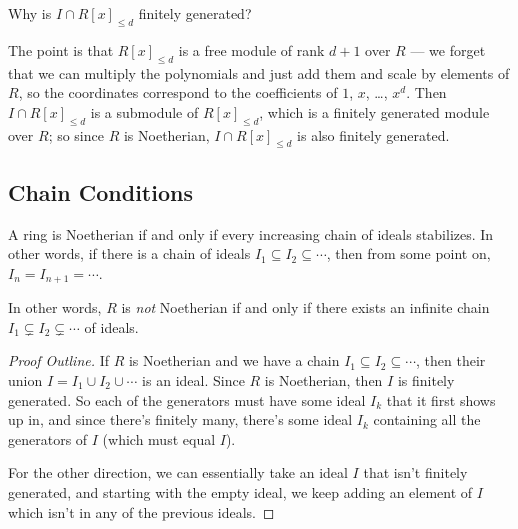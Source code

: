 \begin{question}
Why is $I \cap R[x]_{\leq d}$ finitely generated?
\end{question}

\begin{ans}
The point is that $R[x]_{\leq d}$ is a free module of rank $d + 1$ over $R$ --- we forget that we can multiply the polynomials and just add them and scale by elements of $R$, so the coordinates correspond to the coefficients of $1$, $x$, \ldots, $x^d$. Then $I \cap R[x]_{\leq d}$ is a submodule of $R[x]_{\leq d}$, which is a finitely generated module over $R$; so since $R$ is Noetherian, $I \cap R[x]_{\leq d}$ is also finitely generated. 
\end{ans}

\subsection{Chain Conditions}

\vspace{0.75em}

\begin{proposition} \label{chaincondition}
    A ring is Noetherian if and only if every increasing chain of ideals stabilizes. In other words, if there is a chain of ideals $I_1 \subseteq I_2 \subseteq \cdots$, then from some point on, $I_n = I_{n + 1} = \cdots$. 
\end{proposition}

In other words, $R$ is \emph{not} Noetherian if and only if there exists an infinite chain $I_1 \subsetneq I_2 \subsetneq \cdots$ of ideals. 

\begin{proof}[Proof Outline]
If $R$ is Noetherian and we have a chain $I_1 \subseteq I_2 \subseteq \cdots$, then their union $I = I_1 \cup I_2 \cup \cdots$ is an ideal. Since $R$ is Noetherian, then $I$ is finitely generated. So each of the generators must have some ideal $I_k$ that it first shows up in, and since there's finitely many, there's some ideal $I_k$ containing all the generators of $I$ (which must equal $I$). 

For the other direction, we can essentially take an ideal $I$ that isn't finitely generated, and starting with the empty ideal, we keep adding an element of $I$ which isn't in any of the previous ideals. 
\end{proof}



